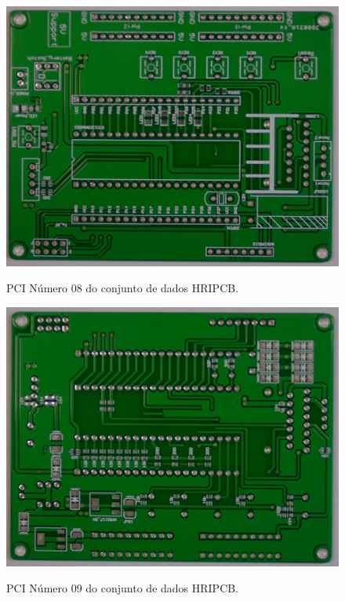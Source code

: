 \begin{figure}[!h] %
  \centering
  \caption{PCI Número 08 do conjunto de dados HRIPCB.}
  \includegraphics[scale=0.13]{img/pcbs/08.JPG}
  \label{fig:ap-pcbs-8}
\end{figure}

\begin{figure}[!h] %
  \centering
  \caption{PCI Número 09 do conjunto de dados HRIPCB.}
  \includegraphics[scale=0.13]{img/pcbs/09.JPG}
  \label{fig:ap-pcbs-9}
\end{figure}

